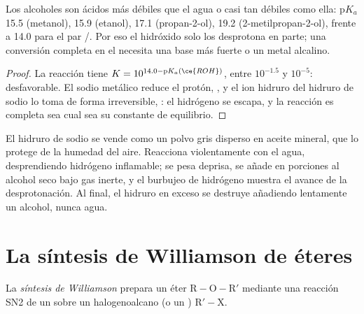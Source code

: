 \begin{proposition}\label{prop:b1:alcohol-activation:alcohol-acidity}
Los alcoholes son ácidos más débiles que el agua o casi tan débiles como
ella: $\mathrm{p}K_a$ 15.5 (metanol), 15.9 (etanol), 17.1 (propan-2-ol),
19.2 (2-metilpropan-2-ol), frente a 14.0 para el par /.
Por eso el hidróxido solo los desprotona en parte; una conversión
completa en el  necesita una base más fuerte o un metal alcalino.
\end{proposition}

\begin{proof}
La reacción  tiene $K = 10^{14.0 -
\mathrm{p}K_a(\ce{ROH})}$, entre $10^{-1.5}$ y $10^{-5}$: desfavorable. El
sodio metálico reduce el protón, , y el
ion hidruro del hidruro de sodio lo toma de forma irreversible,
: el hidrógeno se escapa, y la reacción es
completa sea cual sea su constante de equilibrio.
\end{proof}

\begin{inthelab}
El hidruro de sodio se vende como un polvo gris disperso en aceite
mineral, que lo protege de la humedad del aire. Reacciona violentamente
con el agua, desprendiendo hidrógeno inflamable; se pesa deprisa, se
añade en porciones al alcohol seco bajo gas inerte, y el burbujeo de
hidrógeno muestra el avance de la desprotonación. Al final, el hidruro en
exceso se destruye añadiendo lentamente un alcohol, nunca agua.
\end{inthelab}

\section{La síntesis de Williamson de éteres}

\begin{definition}\label{def:b1:alcohol-activation:williamson}
La \emph{síntesis de Williamson} prepara un éter
$\mathrm{R{-}O{-}R'}$ mediante una reacción SN2 de un  
sobre un halogenoalcano (o un ) $\mathrm{R'{-}X}$.
\end{definition}

